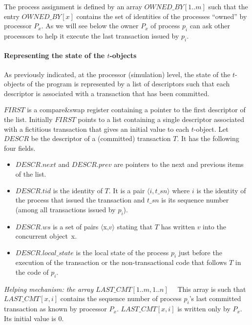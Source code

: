 The process assignment is defined by   an array 
$\mathit{OWNED\_BY}[1..m]$  such that the entry $\mathit{OWNED\_BY}[x]$ 
contains the set of identities of the processes ``owned'' by  processor $P_x$. 
As we will  see below the owner $P_x$ of process $p_i$ can ask other 
processors to help it execute the last transaction issued by $p_i$. 

\paragraph{Representing the state of the $t$-objects}
As previously indicated, at the processor (simulation) level, the state of the
 $t$-objects of the program is represented  by a list  of descriptors such 
that each descriptor is associated with a transaction that has been committed.

$\mathit{FIRST}$ is a compare\&swap register containing  a pointer to the
first descriptor of the list. Initially $\mathit{FIRST}$ points to a  list 
containing a single descriptor associated with a fictitious transaction that
gives an  initial value to  each $t$-object. 
Let $\mathit{DESCR}$ be the descriptor of a (committed) transaction
$T$. It has  the following four fields.
\begin{itemize}
\item 
$\mathit{DESCR}.next$ and $\mathit{DESCR}.prev$ are pointers to the next 
and previous items of the list.
%
\item 
$\mathit{DESCR}.tid$ is the identity of $T$. It is a pair 
$\langle i,t\_sn \rangle $ where $i$ is the identity of the process 
that issued the transaction and  $t\_sn$ is its sequence number (among all
transactions issued by $p_i$). 
%
\item 
$\mathit{DESCR}.ws$ is a set of pairs $\langle${\sc x},$v \rangle$ 
stating that $T$  has written $v$ into the concurrent  object~{\sc x}. 
%
\item $\mathit{DESCR}.local\_state$ is the local state of the process $p_i$ 
just before the  execution of  the transaction or the non-transactional code that follows $T$ in the code of $p_i$.
\end{itemize}



\noindent
{\it Helping mechanism: the array $\mathit{LAST\_CMT}[1..m,1..n]$}~~
This array  is  such that $\mathit{LAST\_CMT}[x,i]$ contains the sequence   
number of process $p_i$'s  last committed transaction as known by processor
$P_x$.  
$\mathit{LAST\_CMT}[x,i]$ is  written only  by  $P_x$. Its initial  value is
$0$.    


